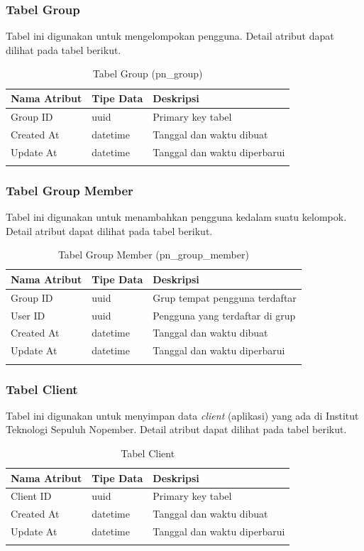 \subsubsection{Tabel Group}
\par Tabel ini digunakan untuk mengelompokan pengguna. Detail atribut dapat dilihat pada tabel berikut.
\begin{longtable}{|p{2.5cm}|p{2cm}|p{4.5cm}|}
    \hline
    \textbf{Nama Atribut} & \textbf{Tipe Data} & \textbf{Deskripsi} \\ \hline
    Group ID & uuid & Primary key tabel \\ \hline
    Created At & datetime & Tanggal dan waktu dibuat \\ \hline
    Update At & datetime & Tanggal dan waktu diperbarui \\ \hline
    \caption{Tabel Group (pn\_group)}
\end{longtable}

\subsubsection{Tabel Group Member}
\par Tabel ini digunakan untuk menambahkan pengguna kedalam suatu kelompok. Detail atribut dapat dilihat pada tabel berikut.
\begin{longtable}{|p{2.5cm}|p{2cm}|p{4.5cm}|}
    \hline
    \textbf{Nama Atribut} & \textbf{Tipe Data} & \textbf{Deskripsi} \\ \hline
    Group ID & uuid & Grup tempat pengguna terdaftar \\ \hline
    User ID & uuid & Pengguna yang terdaftar di grup \\ \hline
    Created At & datetime & Tanggal dan waktu dibuat \\ \hline
    Update At & datetime & Tanggal dan waktu diperbarui \\ \hline
    \caption{Tabel Group Member (pn\_group\_member)}
\end{longtable}

\subsubsection{Tabel Client}
\par Tabel ini digunakan untuk menyimpan data \textit{client} (aplikasi) yang ada di Institut Teknologi Sepuluh Nopember. Detail atribut dapat dilihat pada tabel berikut.
\begin{longtable}{|p{2.5cm}|p{2cm}|p{4.5cm}|}
    \hline
    \textbf{Nama Atribut} & \textbf{Tipe Data} & \textbf{Deskripsi} \\ \hline
    Client ID & uuid & Primary key tabel \\ \hline
    Created At & datetime & Tanggal dan waktu dibuat \\ \hline
    Update At & datetime & Tanggal dan waktu diperbarui \\ \hline
    \caption{Tabel Client}
\end{longtable}

